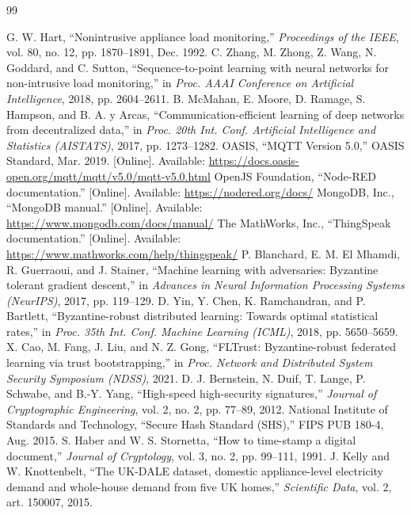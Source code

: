 \documentclass[12pt,a4paper,oneside]{report}
\begin{document}
\begin{thebibliography}{99}
 G. W. Hart, ``Nonintrusive appliance load monitoring,'' \emph{Proceedings of the IEEE}, vol. 80, no. 12, pp. 1870--1891, Dec. 1992.
 C. Zhang, M. Zhong, Z. Wang, N. Goddard, and C. Sutton, ``Sequence-to-point learning with neural networks for non-intrusive load monitoring,'' in \emph{Proc. AAAI Conference on Artificial Intelligence}, 2018, pp. 2604--2611.
 B. McMahan, E. Moore, D. Ramage, S. Hampson, and B. A. y Arcas, ``Communication-efficient learning of deep networks from decentralized data,'' in \emph{Proc. 20th Int. Conf. Artificial Intelligence and Statistics (AISTATS)}, 2017, pp. 1273--1282.
 OASIS, ``MQTT Version 5.0,'' OASIS Standard, Mar. 2019. [Online]. Available: \url{https://docs.oasis-open.org/mqtt/mqtt/v5.0/mqtt-v5.0.html}
 OpenJS Foundation, ``Node-RED documentation.'' [Online]. Available: \url{https://nodered.org/docs/}
 MongoDB, Inc., ``MongoDB manual.'' [Online]. Available: \url{https://www.mongodb.com/docs/manual/}
 The MathWorks, Inc., ``ThingSpeak documentation.'' [Online]. Available: \url{https://www.mathworks.com/help/thingspeak/}
 P. Blanchard, E. M. El Mhamdi, R. Guerraoui, and J. Stainer, ``Machine learning with adversaries: Byzantine tolerant gradient descent,'' in \emph{Advances in Neural Information Processing Systems (NeurIPS)}, 2017, pp. 119--129.
 D. Yin, Y. Chen, K. Ramchandran, and P. Bartlett, ``Byzantine-robust distributed learning: Towards optimal statistical rates,'' in \emph{Proc. 35th Int. Conf. Machine Learning (ICML)}, 2018, pp. 5650--5659.
 X. Cao, M. Fang, J. Liu, and N. Z. Gong, ``FLTrust: Byzantine-robust federated learning via trust bootstrapping,'' in \emph{Proc. Network and Distributed System Security Symposium (NDSS)}, 2021.
 D. J. Bernstein, N. Duif, T. Lange, P. Schwabe, and B.-Y. Yang, ``High-speed high-security signatures,'' \emph{Journal of Cryptographic Engineering}, vol. 2, no. 2, pp. 77--89, 2012.
 National Institute of Standards and Technology, ``Secure Hash Standard (SHS),'' FIPS PUB 180-4, Aug. 2015.
 S. Haber and W. S. Stornetta, ``How to time-stamp a digital document,'' \emph{Journal of Cryptology}, vol. 3, no. 2, pp. 99--111, 1991.
 J. Kelly and W. Knottenbelt, ``The UK-DALE dataset, domestic appliance-level electricity demand and whole-house demand from five UK homes,'' \emph{Scientific Data}, vol. 2, art. 150007, 2015.

\end{thebibliography}
\end{document}
